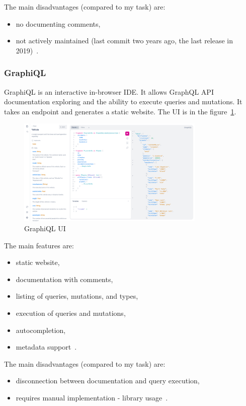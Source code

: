The main disadvantages (compared to my task) are:
\begin{itemize}
    \item no documenting comments,
    \item not actively maintained (last commit two years ago, the last release in 2019)~\cite{graphql-graphql-playground}.
\end{itemize}

\subsubsection{GraphiQL}
GraphiQL is an interactive in-browser IDE\@.
It allows GraphQL API documentation exploring and the ability to execute queries and mutations.
It takes an endpoint and generates a static website.
The UI is in the figure~\ref{fig:graphql-graphiql}.
\cite{graphql-graphiql}

\begin{figure}[hbt!]
    \centering
    \captionsetup{justification=centering}
    \includegraphics[width=0.8\textwidth]{images/graphql/graphiql}
    \caption{GraphiQL UI~\cite{graphql-graphiql}}
    \label{fig:graphql-graphiql}
\end{figure}

The main features are:
\begin{itemize}
    \item static website,
    \item documentation with comments,
    \item listing of queries, mutations, and types,
    \item execution of queries and mutations,
    \item autocompletion,
    \item metadata support~\cite{graphql-graphiql}.
\end{itemize}

The main disadvantages (compared to my task) are:
\begin{itemize}
    \item disconnection between documentation and query execution,
    \item requires manual implementation - library usage~\cite{graphql-graphiql}.
\end{itemize}

